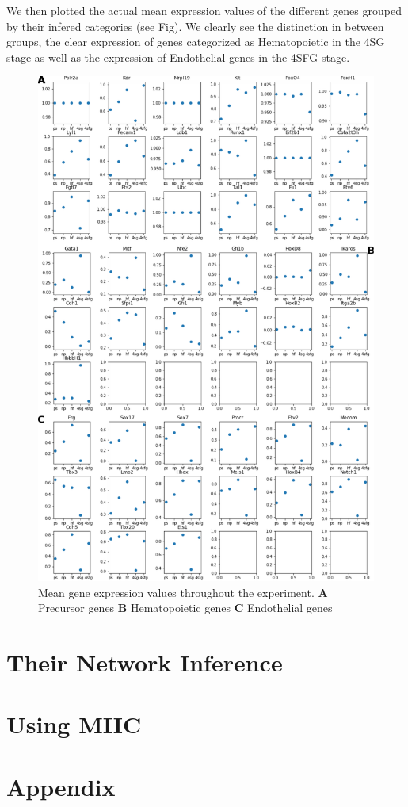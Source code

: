 \documentclass[a4paper,12pt]{book}
\theoremstyle{break}
\begin{document}
		We then plotted the actual mean expression values of the different genes grouped by their infered categories (see Fig). We clearly see the distinction in between groups, the clear expression of genes categorized as Hematopoietic in the 4SG stage as well as the expression of Endothelial genes in the 4SFG stage. 
	\begin{figure}[h!]
		\centering
		\includegraphics[width = 0.9\linewidth, height = 0.8\textheight]{../Preliminary/exptot.pdf}
		\caption{Mean gene expression values throughout the experiment. \textbf{A} Precursor genes \textbf{B} Hematopoietic genes \textbf{C} Endothelial genes}
		\label{fig:meangene}
	\end{figure}


\section*{Their Network Inference}
\section*{Using MIIC}
\section*{Appendix}

	
\end{document}
